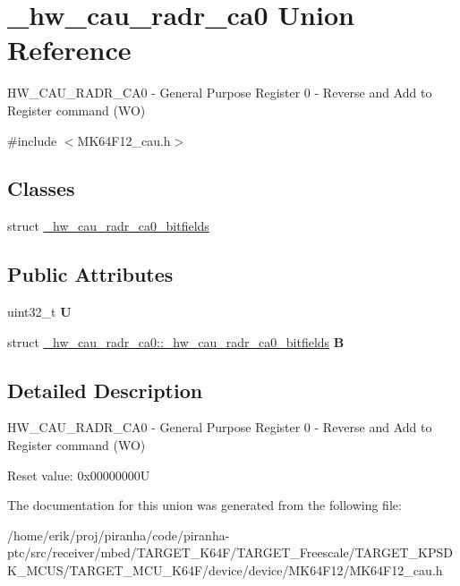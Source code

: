 \hypertarget{union__hw__cau__radr__ca0}{}\section{\+\_\+hw\+\_\+cau\+\_\+radr\+\_\+ca0 Union Reference}
\label{union__hw__cau__radr__ca0}


H\+W\+\_\+\+C\+A\+U\+\_\+\+R\+A\+D\+R\+\_\+\+C\+A0 -\/ General Purpose Register 0 -\/ Reverse and Add to Register command (WO)  




{\ttfamily \#include $<$M\+K64\+F12\+\_\+cau.\+h$>$}

\subsection*{Classes}
\begin{DoxyCompactItemize}
\item 
struct \hyperlink{struct__hw__cau__radr__ca0_1_1__hw__cau__radr__ca0__bitfields}{\+\_\+hw\+\_\+cau\+\_\+radr\+\_\+ca0\+\_\+bitfields}
\end{DoxyCompactItemize}
\subsection*{Public Attributes}
\begin{DoxyCompactItemize}
\item 
uint32\+\_\+t {\bfseries U}\hypertarget{union__hw__cau__radr__ca0_af6f275971d9c78d4eab600e1a90d4820}{}\label{union__hw__cau__radr__ca0_af6f275971d9c78d4eab600e1a90d4820}

\item 
struct \hyperlink{struct__hw__cau__radr__ca0_1_1__hw__cau__radr__ca0__bitfields}{\+\_\+hw\+\_\+cau\+\_\+radr\+\_\+ca0\+::\+\_\+hw\+\_\+cau\+\_\+radr\+\_\+ca0\+\_\+bitfields} {\bfseries B}\hypertarget{union__hw__cau__radr__ca0_ab5f1611affe8251a0944dbf7375945c1}{}\label{union__hw__cau__radr__ca0_ab5f1611affe8251a0944dbf7375945c1}

\end{DoxyCompactItemize}


\subsection{Detailed Description}
H\+W\+\_\+\+C\+A\+U\+\_\+\+R\+A\+D\+R\+\_\+\+C\+A0 -\/ General Purpose Register 0 -\/ Reverse and Add to Register command (WO) 

Reset value\+: 0x00000000U 

The documentation for this union was generated from the following file\+:\begin{DoxyCompactItemize}
\item 
/home/erik/proj/piranha/code/piranha-\/ptc/src/receiver/mbed/\+T\+A\+R\+G\+E\+T\+\_\+\+K64\+F/\+T\+A\+R\+G\+E\+T\+\_\+\+Freescale/\+T\+A\+R\+G\+E\+T\+\_\+\+K\+P\+S\+D\+K\+\_\+\+M\+C\+U\+S/\+T\+A\+R\+G\+E\+T\+\_\+\+M\+C\+U\+\_\+\+K64\+F/device/device/\+M\+K64\+F12/M\+K64\+F12\+\_\+cau.\+h\end{DoxyCompactItemize}
